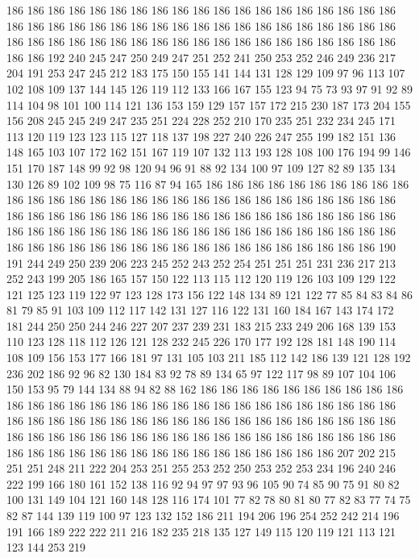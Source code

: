 186 186 186 186 186 186 186 186 186 186 186 186 186 186 186 186 186 186 186 186
186 186 186 186 186 186 186 186 186 186 186 186 186 186 186 186 186 186 186 186
186 186 186 186 186 186 186 186 186 186 186 186 186 186 186 186 186 186 186 192
240 245 247 250 249 247 251 252 241 250 253 252 246 249 236 217 204 191 253 247
245 212 183 175 150 155 141 144 131 128 129 109 97 96 113 107 102 108 109 137
144 145 126 119 112 133 166 167 155 123 94 75 73 93 97 91 92 89 114 104
98 101 100 114 121 136 153 159 129 157 157 172 215 230 187 173 204 155 156 208
245 245 249 247 235 251 224 228 252 210 170 235 251 232 234 245 171 113 120 119
123 123 115 127 118 137 198 227 240 226 247 255 199 182 151 136 148 165 103 107
172 162 151 167 119 107 132 113 193 128 108 100 176 194 99 146 151 170 187 148
99 92 98 120 94 96 91 88 92 134 100 97 109 127 82 89 135 134 130 126
89 102 109 98 75 116 87 94 165 186 186 186 186 186 186 186 186 186 186 186
186 186 186 186 186 186 186 186 186 186 186 186 186 186 186 186 186 186 186 186
186 186 186 186 186 186 186 186 186 186 186 186 186 186 186 186 186 186 186 186
186 186 186 186 186 186 186 186 186 186 186 186 186 186 186 186 186 186 186 186
186 186 186 186 186 186 186 186 186 186 186 186 186 186 190 191 244 249 250 239
206 223 245 252 243 252 254 251 251 251 231 236 217 213 252 243 199 205 186 165
157 150 122 113 115 112 120 119 126 103 109 129 122 121 125 123 119 122 97 123
128 173 156 122 148 134 89 121 122 77 85 84 83 84 86 81 79 85 91 103
109 112 117 142 131 127 116 122 131 160 184 167 143 174 172 181 244 250 250 244
246 227 207 237 239 231 183 215 233 249 206 168 139 153 110 123 128 118 112 126
121 128 232 245 226 170 177 192 128 181 148 190 114 108 109 156 153 177 166 181
97 131 105 103 211 185 112 142 186 139 121 128 192 236 202 186 92 96 82 130
184 83 92 78 89 134 65 97 122 117 98 89 107 104 106 150 153 95 79 144
134 88 94 82 88 162 186 186 186 186 186 186 186 186 186 186 186 186 186 186
186 186 186 186 186 186 186 186 186 186 186 186 186 186 186 186 186 186 186 186
186 186 186 186 186 186 186 186 186 186 186 186 186 186 186 186 186 186 186 186
186 186 186 186 186 186 186 186 186 186 186 186 186 186 186 186 186 186 186 186
186 186 186 186 186 186 186 186 186 207 202 215 251 251 248 211 222 204 253 251
255 253 252 250 253 252 253 234 196 240 246 222 199 166 180 161 152 138 116 92
94 97 97 93 96 105 90 74 85 90 75 91 80 82 100 131 149 104 121 160
148 128 116 174 101 77 82 78 80 81 80 77 82 83 77 74 75 82 87 144
139 119 100 97 123 132 152 186 211 194 206 196 254 252 242 214 196 191 166 189
222 222 211 216 182 235 218 135 127 149 115 120 119 121 113 121 123 144 253 219
